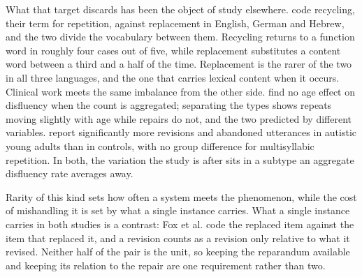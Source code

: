\documentclass{article}
\begin{document}
What that target discards has been the object of study elsewhere.
\citet{foxCrosslinguisticStudySelfrepair2010} code recycling, their term for
repetition, against replacement in English, German and Hebrew, and the two divide
the vocabulary between them. Recycling returns to a function word in roughly four
cases out of five, while replacement substitutes a content word between a third
and a half of the time. Replacement is the rarer of the two in all three
languages, and the one that carries lexical content when it occurs. Clinical work meets the same imbalance
from the other side. \citet{beierDisfluenciesAge2023} find no age effect on
disfluency when the count is aggregated; separating the types shows repeats
moving slightly with age while repairs do not, and the two predicted by different
variables. \citet{pirinenComprehensiveAnalysis2023} report significantly more
revisions and abandoned utterances in autistic young adults than in controls,
with no group difference for multisyllabic repetition. In both, the variation the
study is after sits in a subtype an aggregate disfluency rate averages away.

Rarity of this kind sets how often a system meets the phenomenon, while the cost
of mishandling it is set by what a single instance carries. What a single
instance carries in both studies is a contrast: Fox et al. code the replaced item
against the item that replaced it, and a revision counts as a revision only
relative to what it revised. Neither half of the pair is the unit, so keeping the
reparandum available and keeping its relation to the repair are one requirement
rather than two.
\end{document}

